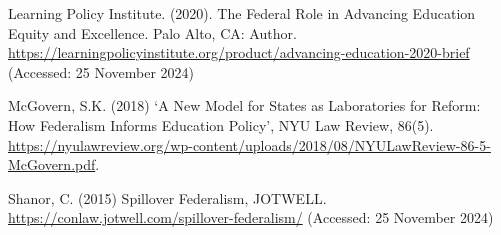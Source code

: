 \documentclass[11pt]{extarticle}
\begin{document}
\par \vspace{0.5cm}
\begin{hangparas}{.25in}{1}
Learning Policy Institute. (2020). The Federal Role in Advancing Education Equity and Excellence. Palo Alto, CA: Author. \url{https://learningpolicyinstitute.org/product/advancing-education-2020-brief} (Accessed: 25 November 2024)
\end{hangparas}
\par \vspace{0.5cm}
\begin{hangparas}{.25in}{1}
McGovern, S.K. (2018) ‘A New Model for States as Laboratories for Reform: How Federalism Informs Education Policy’, NYU Law Review, 86(5). \url{https://nyulawreview.org/wp-content/uploads/2018/08/NYULawReview-86-5-McGovern.pdf}.
\end{hangparas}
\par \vspace{0.5cm}
\begin{hangparas}{.25in}{1}
Shanor, C. (2015) Spillover Federalism, JOTWELL. \url{https://conlaw.jotwell.com/spillover-federalism/} (Accessed: 25 November 2024)
\end{hangparas}
\end{document}
